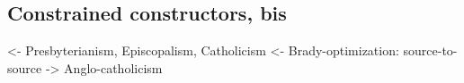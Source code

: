 \documentclass[preprint, authoryear, onecolumn]{sigplanconf}
\newenvironment{structure}{\footnotesize\verbatim}{\endverbatim}
\begin{document}
\subsection{Constrained constructors, bis}

\begin{structure}
<- Presbyterianism, Episcopalism, Catholicism
<- Brady-optimization: source-to-source
    -> Anglo-catholicism
\end{structure}





\end{document}
